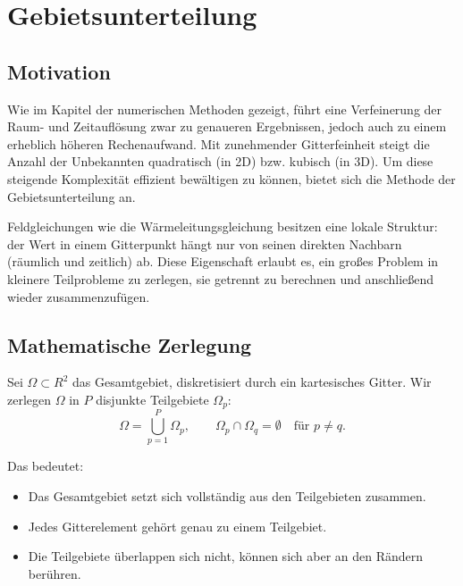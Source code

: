 %
%
\section{Gebietsunterteilung}
\label{parallelisierung:sec:dd}

\subsection{Motivation}
Wie im Kapitel der numerischen Methoden gezeigt, führt eine Verfeinerung der Raum- und Zeitauflösung zwar zu genaueren Ergebnissen, jedoch auch zu einem erheblich höheren Rechenaufwand. 
Mit zunehmender Gitterfeinheit steigt die Anzahl der Unbekannten quadratisch (in 2D) bzw. kubisch (in 3D).  
Um diese steigende Komplexität effizient bewältigen zu können, bietet sich die Methode der Gebietsunterteilung an.

Feldgleichungen wie die Wärmeleitungsgleichung besitzen eine lokale Struktur: 
der Wert in einem Gitterpunkt hängt nur von seinen direkten Nachbarn (räumlich und zeitlich) ab.  
Diese Eigenschaft erlaubt es, ein großes Problem in kleinere Teilprobleme zu zerlegen, sie getrennt zu berechnen und anschließend wieder zusammenzufügen.

\subsection{Mathematische Zerlegung}
Sei $\Omega \subset {R}^2$ das Gesamtgebiet, diskretisiert durch ein kartesisches Gitter.  
Wir zerlegen $\Omega$ in $P$ disjunkte Teilgebiete $\Omega_p$:
\begin{equation}
	\Omega = \bigcup_{p=1}^P \Omega_p,
	\qquad 
	\Omega_p \cap \Omega_q = \emptyset \quad \text{für } p \neq q.
\end{equation}

Das bedeutet:
\begin{itemize}
	\item Das Gesamtgebiet setzt sich vollständig aus den Teilgebieten zusammen.
	\item Jedes Gitterelement gehört genau zu einem Teilgebiet.
	\item Die Teilgebiete überlappen sich nicht, können sich aber an den Rändern berühren.
\end{itemize}

